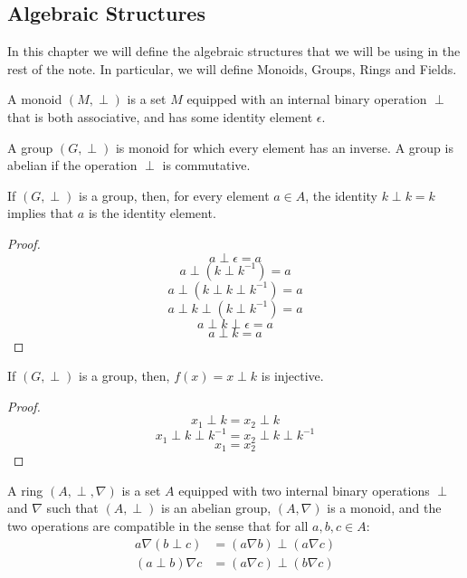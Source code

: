 \subsection{Algebraic Structures}
In this chapter we will define the algebraic structures that we will be using in the 
rest of the note. In particular, we will define Monoids, Groups, Rings and Fields.  

\begin{definition}[Monoid]
    A monoid $(M, \perp)$ is a set $M$ equipped with an internal binary operation 
    $\perp$ that is both associative, and has some identity element $\epsilon$.
\end{definition}

\begin{definition}
    A group $(G, \perp)$ is monoid for which every element has an inverse. A 
    group is abelian if the operation $\perp$ is commutative.
\end{definition}

\begin{lemma}
    If $(G, \perp)$ is a group, then, for every element $a \in A$, the identity
    $k \perp k = k$ implies that $a$ is the identity element.
\end{lemma}
\begin{proof}
    $$ a \perp \epsilon = a $$
    $$ a \perp (k \perp k^{-1}) = a $$
    $$ a \perp (k \perp k \perp k^{-1}) = a $$
    $$ a \perp k \perp (k \perp k^{-1}) = a $$
    $$ a \perp k \perp \epsilon = a $$
    $$ a \perp k = a $$
\end{proof}

\begin{lemma}
    If $(G, \perp)$ is a group, then, $f(x) = x \perp k$ is injective.
\end{lemma}
\begin{proof}
    $$ x_1 \perp k = x_2 \perp k $$
    $$ x_1 \perp k \perp k^{-1} = x_2 \perp k \perp k^{-1} $$
    $$ x_1 = x_2 $$
\end{proof}

\begin{definition}[Ring]
    A ring $(A, \perp, \nabla)$ is a set $A$ equipped with two internal binary operations
    $\perp$ and $\nabla$ such that $(A, \perp)$ is an abelian group, $(A, \nabla)$ is a monoid, 
    and the two operations are compatible in the sense that for all $a, b, c \in A$:
    \begin{align*}
        a \nabla (b \perp c) &= (a \nabla b) \perp (a \nabla c)\\
        (a \perp b) \nabla c &= (a \nabla c) \perp (b \nabla c)
    \end{align*}
\end{definition} \vspace{1em}

